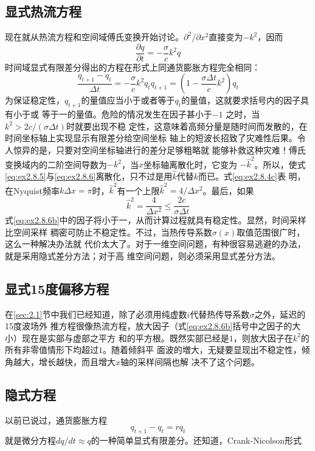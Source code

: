 \subsection{显式热流方程}
\label{sec:2.8.1}

现在就从热流方程和空间域傅氏变换开始讨论。$\partial^2/\partial x^2$直接变为$-k^2$，因而
\begin{equation}
\frac{\partial q}{\partial t}=-\frac{\sigma}{c}k^2q
\label{eq:ex2.8.5}
\end{equation}
时间域显式有限差分得出的方程在形式上同通货膨胀方程完全相同：
\begin{subequations}
  \begin{equation}
  \frac{q_{t+1}-q_t}{\Delta t}=-\frac{\sigma}{c}k^2q_t
  \label{eq:ex2.8.6a}
  \end{equation}
  \begin{equation}
  q_{t+1}=(1-\frac{\sigma\Delta t}{c}k^2)q_t
  \label{eq:ex2.8.6b}
  \end{equation}
\label{eq:ex2.8.6}
\end{subequations}
为保证稳定性，$q_{t+1}$的量值应当小于或者等于$q_t$的量值，这就要求括号内的因子具有小于或
等于一的量值。危险的情况发生在因子甚小于$-1$
之时，当$k^2>2c/(\sigma\Delta t)$时就要出现不稳
定性，这意味着高频分量是随时间而发散的，在时间坐标轴上实现显示有限差分给空间坐标
轴上的短波长招致了灾难性后果。令人惊异的是，只要对空间坐标轴进行的差分足够粗略就
能够补救这种灾难！傅氏变换域内的二阶空间导数为$-k^2$，当$x$坐标轴离散化时，它变为
$-\hat{k}^2$。所以，使式\ref{eq:ex2.8.5}与\ref{eq:ex2.8.6}离散化，只不过是用$\hat{k}$代替$k$而已。式\ref{eq:ex2.8.4c}表
明，在Nyquist频率$k\Delta x=\pi$时，$\hat{k}^2$有一个上限$\hat{k}^2=4/\Delta x^2$。最后，如果
\begin{equation}
\hat{k}^2=\frac{4}{\Delta x^2}\leq\frac{2c}{\sigma\Delta t}
\label{eq:ex2.8.7}
\end{equation}
式\ref{eq:ex2.8.6b}中的因子将小于一，从而计算过程就具有稳定性。显然，时间采样比空间采样
稠密可防止不稳定性。不过，当热传导系数$\sigma(x)$取值范围很广时，这么一种解决办法就
代价太大了。对于一维空间问题，有种很容易逃避的办法，就是采用隐式差分方法；对于高
维空间问题，则必须采用显式差分方法。

\subsection{显式15度偏移方程}
\label{sec:2.8.2}

在\ref{sec:2.1}节中我们已经知道，除了必须用纯虚数$i$代替热传导系数$\sigma$之外，延迟的15度波场外
推方程很像热流方程，放大因子（式\ref{eq:ex2.8.6b}括号中之因子的大小）现在是实部与虚部之平方
和的平方根。既然实部已经是$1$，则放大因子在$k^2$的所有非零值情形下均超过$1$。随着倾斜平
面波的増大，无疑要显现出不稳定性，倾角越大，增长越快，而且增大$x$轴的采样间隔也解
决不了这个问题。

\subsection{隐式方程}
\label{sec:2.8.3}
以前已说过，通货膨胀方程
\begin{equation}
q_{t+1}-q_t=rq_t
\label{eq:ex2.8.8}
\end{equation}
就是微分方程$dq/dt\approx q$的一种简单显式有限差分。还知道，Crank-Nicolson形式
